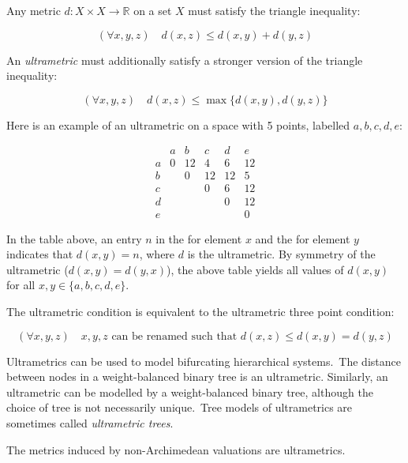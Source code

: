 \documentclass[12pt]{article}
\begin{document}
Any metric $d: X \times X \to \mathbb{R}$ on a set $X$ must satisfy the triangle inequality:

\begin{equation*}
(\forall x,y,z) \quad d(x,z) \leq d(x,y) + d(y,z)
\end{equation*}

An {\em ultrametric} must additionally satisfy a stronger version of the triangle inequality:


\begin{equation*}
(\forall x,y,z) \quad d(x,z) \leq \max\{ d(x,y),  d(y,z) \}
\end{equation*}

Here is an example of an ultrametric on a space with 5 points, labelled $a,b,c,d,e$:

\begin{equation*}
\begin{array}{c|c|c|c|c|c}
   & a  & b  & c  & d  & e
\\ \hline
 a & 0  & 12 & 4  & 6  & 12
\\ \hline
 b &    & 0  & 12 & 12 & 5
\\ \hline
 c &    &    & 0  & 6  & 12
\\ \hline
 d &    &    &    & 0  & 12
\\ \hline
 e &    &    &    &    & 0
\end{array}
\end{equation*}

In the table above, an entry $n$ in the  for element $x$ and the  for element $y$ indicates that $d(x,y)=n$, where $d$ is the ultrametric.  By symmetry of the ultrametric ($d(x,y)=d(y,x)$), the above table yields all values of $d(x,y)$ for all $x,y \in \{a,b,c,d,e\}$.

The ultrametric condition is equivalent to the ultrametric three point condition:

\begin{equation*}
(\forall x,y,z) \quad x,y,z \textrm{ can be renamed such that } d(x,z) \leq d(x,y) = d(y,z)
\end{equation*}

Ultrametrics can be used to model bifurcating hierarchical systems.\, The distance between nodes in a weight-balanced binary tree is an ultrametric. Similarly, an ultrametric can be modelled by a weight-balanced binary tree, although the choice of tree is not necessarily unique.\, Tree models of ultrametrics are sometimes called \emph{ultrametric trees}.

The metrics induced by non-Archimedean valuations are ultrametrics.

\end{document}
